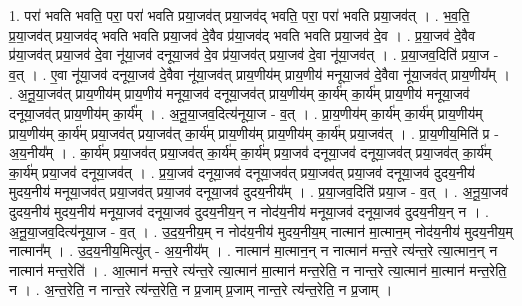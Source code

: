 \documentclass[17pt]{extarticle}
\begin{document}
1. परा॑ भवति भवति॒ परा॒ परा॑ भवति प्रया॒जव॑त् प्रया॒जव॑द् भवति॒ परा॒ परा॑ भवति प्रया॒जव॑त् । . भ॒व॒ति॒ प्र॒या॒जव॑त् प्रया॒जव॑द् भवति भवति प्रया॒जव॑ दे॒वैव प्र॑या॒जव॑द् भवति भवति प्रया॒जव॑ दे॒व । . प्र॒या॒जव॑ दे॒वैव प्र॑या॒जव॑त् प्रया॒जव॑ दे॒वा नू॑या॒जव॑ दनूया॒जव॑ दे॒व प्र॑या॒जव॑त् प्रया॒जव॑ दे॒वा नू॑या॒जव॑त् । . प्र॒या॒जव॒दिति॑ प्रया॒ज - व॒त् । . ए॒वा नू॑या॒जव॑ दनूया॒जव॑ दे॒वैवा नू॑या॒जव॑त् प्राय॒णीय॑म् प्राय॒णीय॑ मनूया॒जव॑ दे॒वैवा नू॑या॒जव॑त् प्राय॒णीय᳚म् । . अ॒नू॒या॒जव॑त् प्राय॒णीय॑म् प्राय॒णीय॑ मनूया॒जव॑ दनूया॒जव॑त् प्राय॒णीय॑म् का॒र्य॑म् का॒र्य॑म् प्राय॒णीय॑ मनूया॒जव॑ दनूया॒जव॑त् प्राय॒णीय॑म् का॒र्य᳚म् । . अ॒नू॒या॒जव॒दित्य॑नूया॒ज - व॒त् । . प्रा॒य॒णीय॑म् का॒र्य॑म् का॒र्य॑म् प्राय॒णीय॑म् प्राय॒णीय॑म् का॒र्य॑म् प्रया॒जव॑त् प्रया॒जव॑त् का॒र्य॑म् प्राय॒णीय॑म् प्राय॒णीय॑म् का॒र्य॑म् प्रया॒जव॑त् । . प्रा॒य॒णीय॒मिति॑ प्र - अ॒य॒नीय᳚म् । . का॒र्य॑म् प्रया॒जव॑त् प्रया॒जव॑त् का॒र्य॑म् का॒र्य॑म् प्रया॒जव॑ दनूया॒जव॑ दनूया॒जव॑त् प्रया॒जव॑त् का॒र्य॑म् का॒र्य॑म् प्रया॒जव॑ दनूया॒जव॑त् । . प्र॒या॒जव॑ दनूया॒जव॑ दनूया॒जव॑त् प्रया॒जव॑त् प्रया॒जव॑ दनूया॒जव॑ दुदय॒नीय॑ मुदय॒नीय॑ मनूया॒जव॑त् प्रया॒जव॑त् प्रया॒जव॑ दनूया॒जव॑ दुदय॒नीय᳚म् । . प्र॒या॒जव॒दिति॑ प्रया॒ज - व॒त् । . अ॒नू॒या॒जव॑ दुदय॒नीय॑ मुदय॒नीय॑ मनूया॒जव॑ दनूया॒जव॑ दुदय॒नीय॒न् न नोद॑य॒नीय॑ मनूया॒जव॑ दनूया॒जव॑ दुदय॒नीय॒न् न । . अ॒नू॒या॒जव॒दित्य॑नूया॒ज - व॒त् । . उ॒द॒य॒नीय॒म् न नोद॑य॒नीय॑ मुदय॒नीय॒म् नात्मान॑ मा॒त्मान॒म् नोद॑य॒नीय॑ मुदय॒नीय॒म् नात्मान᳚म् । . उ॒द॒य॒नीय॒मित्यु॑त् - अ॒य॒नीय᳚म् । . नात्मान॑ मा॒त्मान॒न् न नात्मान॑ मन्त॒रे त्य॑न्त॒रे त्या॒त्मान॒न् न नात्मान॑ मन्त॒रेति॑ । . आ॒त्मान॑ मन्त॒रे त्य॑न्त॒रे त्या॒त्मान॑ मा॒त्मान॑ मन्त॒रेति॒ न नान्त॒रे त्या॒त्मान॑ मा॒त्मान॑ मन्त॒रेति॒ न । . अ॒न्त॒रेति॒ न नान्त॒रे त्य॑न्त॒रेति॒ न प्र॒जाम् प्र॒जाम् नान्त॒रे त्य॑न्त॒रेति॒ न प्र॒जाम् । \newline
\end{document}
